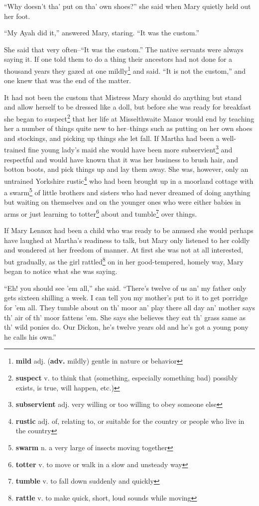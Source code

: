 ``Why doesn't tha' put on tha' own shoes?'' she said when Mary quietly held out her foot.

``My Ayah did it,'' answered Mary, staring. ``It was the custom.''

She said that very often--``It was the custom.'' The native servants were always saying it. If one told them to do a thing their ancestors had not done for a thousand years they gazed at one mildly\footnote{\textbf{mild} adj. (\textbf{adv.} mildly) gentle in nature or behavior} and said. ``It is not the custom,'' and one knew that was the end of the matter.

It had not been the custom that Mistress Mary should do anything but stand and allow herself to be dressed like a doll, but before she was ready for breakfast she began to suspect\footnote{\textbf{suspect} v. to think that (something, especially something bad) possibly exists, is true, will happen, etc.)} that her life at Misselthwaite Manor would end by teaching her a number of things quite new to her--things such as putting on her own shoes and stockings, and picking up things she let fall. If Martha had been a well-trained fine young lady's maid she would have been more subservient\footnote{\textbf{subservient} adj. very willing or too willing to obey someone else} and respectful and would have known that it was her business to brush hair, and botton boots, and pick things up and lay them away. She was, however, only an untrained Yorkshire rustic\footnote{\textbf{rustic} adj. of, relating to, or suitable for the country or people who live in the country} who had been brought up in a moorland cottage with a swarm\footnote{\textbf{swarm} n. a very large of insects moving together} of little brothers and sisters who had never dreamed of doing anything but waiting on themselves and on the younger ones who were either babies in arms or just learning to totter\footnote{\textbf{totter} v. to move or walk in a slow and unsteady way} about and tumble\footnote{\textbf{tumble} v. to fall down suddenly and quickly} over things.

If Mary Lennox had been a child who was ready to be amused she would perhaps have laughed at Martha's readiness to talk, but Mary only listened to her coldly and wondered at her freedom of manner. At first she was not at all interested, but gradually, as the girl rattled\footnote{\textbf{rattle} v. to make quick, short, loud sounds while moving} on in her good-tempered, homely way, Mary began to notice what she was saying.

``Eh! you should see 'em all,'' she said. ``There's twelve of us an' my father only gets sixteen shilling a week. I can tell you my mother's put to it to get porridge for 'em all. They tumble about on th' moor an' play there all day an' mother says th' air of th' moor fattens 'em. She says she believes they eat th' grass same as th' wild ponies do. Our Dickon, he's twelve years old and he's got a young pony he calls his own.''

